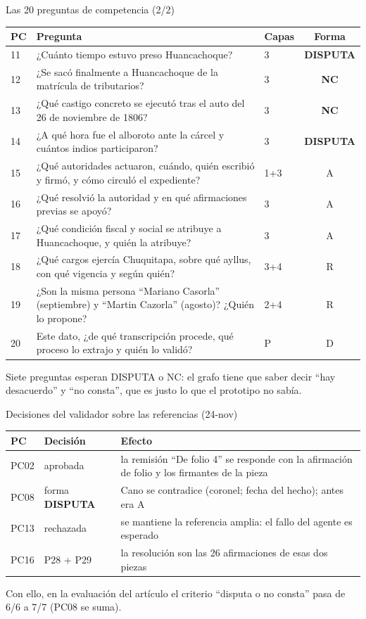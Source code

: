 \documentclass[aspectratio=169,10pt]{beamer}
\begin{document}
\begin{frame}{Las 20 preguntas de competencia (2/2)}
\scriptsize
\begin{tabular}{@{}lp{9.6cm}lc@{}}
\toprule
PC & Pregunta & Capas & Forma \\
\midrule
11 & ¿Cuánto tiempo estuvo preso Huancachoque? & 3 & \textbf{DISPUTA} \\
12 & ¿Se sacó finalmente a Huancachoque de la matrícula de tributarios? & 3 & \textbf{NC} \\
13 & ¿Qué castigo concreto se ejecutó tras el auto del 26 de noviembre de 1806? & 3 & \textbf{NC} \\
14 & ¿A qué hora fue el alboroto ante la cárcel y cuántos indios participaron? & 3 & \textbf{DISPUTA} \\
15 & ¿Qué autoridades actuaron, cuándo, quién escribió y firmó, y cómo circuló el expediente? & 1+3 & A \\
16 & ¿Qué resolvió la autoridad y en qué afirmaciones previas se apoyó? & 3 & A \\
17 & ¿Qué condición fiscal y social se atribuye a Huancachoque, y quién la atribuye? & 3 & A \\
18 & ¿Qué cargos ejercía Chuquitapa, sobre qué ayllus, con qué vigencia y según quién? & 3+4 & R \\
19 & ¿Son la misma persona \enquote{Mariano Casorla} (septiembre) y \enquote{Martin Cazorla} (agosto)? ¿Quién lo propone? & 2+4 & R \\
20 & Este dato, ¿de qué transcripción procede, qué proceso lo extrajo y quién lo validó? & P & D \\
\bottomrule
\end{tabular}

\medskip
\footnotesize Siete preguntas esperan DISPUTA o NC: el grafo tiene que saber decir \enquote{hay desacuerdo} y \enquote{no
consta}, que es justo lo que el prototipo no sabía.
\end{frame}

\begin{frame}{Decisiones del validador sobre las referencias (24-nov)}
\small
\begin{tabular}{@{}llp{8.2cm}@{}}
\toprule
PC & Decisión & Efecto \\
\midrule
PC02 & aprobada & la remisión \enquote{De folio 4} se responde con la afirmación de folio y los firmantes de la pieza \\
PC08 & forma \textbf{DISPUTA} & Cano se contradice (coronel; fecha del hecho); antes era A \\
PC13 & rechazada & se mantiene la referencia amplia: el fallo del agente es esperado \\
PC16 & P28 + P29 & la resolución son las 26 afirmaciones de esas dos piezas \\
\bottomrule
\end{tabular}

\medskip
Con ello, en la evaluación del artículo el criterio \enquote{disputa o no consta} pasa de 6/6 a \alert{7/7} (PC08 se suma).
\end{frame}
\end{document}
